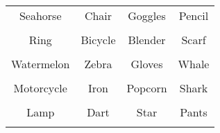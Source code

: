 \documentclass[12pt,a4paper]{article}
\begin{document}
\thispagestyle{empty}
\begin{table}[]
\centering
\Huge
\begin{tabular}{cccc}
 Seahorse& Chair& Goggles& Pencil\\  & & & \\
 Ring& Bicycle& Blender& Scarf\\  & & & \\
 Watermelon& Zebra& Gloves& Whale\\  & & & \\
 Motorcycle& Iron& Popcorn& Shark\\  & & & \\
 Lamp& Dart& Star& Pants\\  & & & \\
\end{tabular}
\end{table}
\end{document}
